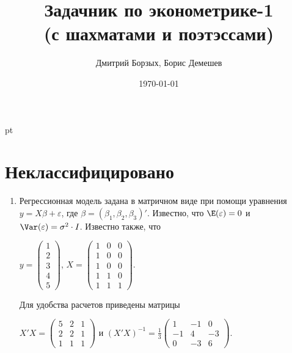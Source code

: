 \documentclass[pdftex,12pt,a4paper]{article}
\title{Задачник по эконометрике-1 \\ {\small (с шахматами и поэтэссами)}}
\author{Дмитрий Борзых, Борис Демешев}
\date{\today}
\begin{document}
\maketitle %


 pt %

\section{Неклассифицировано}

\begin{enumerate}
\item Регрессионная модель   задана в матричном виде при помощи уравнения $y=X\beta+\varepsilon$, где $\beta=(\beta_1,\beta_2,\beta_3)'$.
Известно, что $\E(\varepsilon)=0$  и  $\Var(\varepsilon)=\sigma^2\cdot I$.
Известно также, что 

$y=\left(
\begin{array}{c} 
1\\ 
2\\ 
3\\ 
4\\ 
5
\end{array}\right)$, 
$X=\left(\begin{array}{ccc}
1 & 0 & 0 \\
1 & 0 & 0 \\
1 & 0 & 0 \\
1 & 1 & 0 \\
1 & 1 & 1 
\end{array}\right)$.


Для удобства расчетов приведены матрицы 


$X'X=\left(
\begin{array}{ccc} 
5 & 2 & 1\\ 
2 & 2 & 1\\ 
1 & 1 & 1 
\end{array}\right)$ и $(X'X)^{-1}=\frac{1}{3}\left(
\begin{array}{ccc} 
1 & -1 & 0 \\
-1 & 4 & -3 \\
0 & -3 & 6
\end{array}\right)$.


\end{enumerate}
\end{document}
